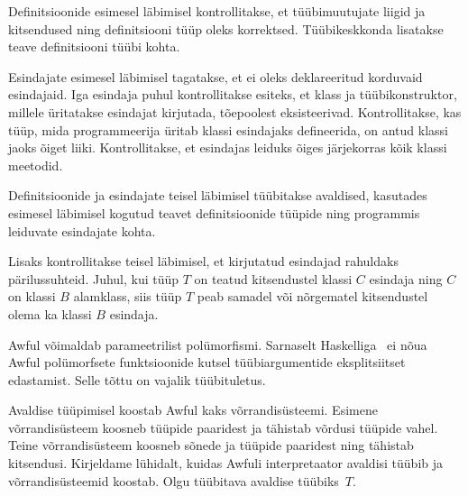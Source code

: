 \documentclass[12pt]{article}
\begin{document}
        Definitsioonide esimesel läbimisel kontrollitakse, et tüübimuutujate liigid ja kitsendused ning definitsiooni tüüp oleks korrektsed. Tüübikeskkonda lisatakse teave definitsiooni tüübi kohta.

        Esindajate esimesel läbimisel tagatakse, et ei oleks deklareeritud korduvaid esindajaid. Iga esindaja puhul kontrollitakse esiteks, et klass ja tüübikonstruktor, millele üritatakse esindajat kirjutada, tõepoolest eksisteerivad. Kontrollitakse, kas tüüp, mida programmeerija üritab klassi esindajaks defineerida, on antud klassi jaoks õiget liiki. Kontrollitakse, et esindajas leiduks õiges järjekorras kõik klassi meetodid.

        Definitsioonide ja esindajate teisel läbimisel tüübitakse avaldised, kasutades esimesel läbimisel kogutud teavet definitsioonide tüüpide ning programmis leiduvate esindajate kohta.

        Lisaks kontrollitakse teisel läbimisel, et kirjutatud esindajad rahuldaks pärilussuhteid. Juhul, kui tüüp $T$ on teatud kitsendustel klassi $C$ esindaja ning $C$ on klassi $B$ alamklass, siis tüüp $T$ peab samadel või nõrgematel kitsendustel olema ka klassi $B$ esindaja.

        Awful võimaldab parameetrilist polümorfismi. Sarnaselt Haskelliga~\cite{Has} ei nõua Awful polümorfsete funktsioonide kutsel tüübiargumentide eksplitsiitset edastamist. Selle tõttu on vajalik tüübituletus.

        Avaldise tüüpimisel koostab Awful kaks võrrandisüsteemi. Esimene võrrandisüsteem koosneb tüüpide paaridest ja tähistab võrdusi tüüpide vahel. Teine võrrandisüsteem koosneb sõnede ja tüüpide paaridest ning tähistab kitsendusi. Kirjeldame lühidalt, kuidas Awfuli interpretaator avaldisi tüübib ja võrrandisüsteemid koostab. Olgu tüübitava avaldise tüübiks~$T$.
\end{document}
